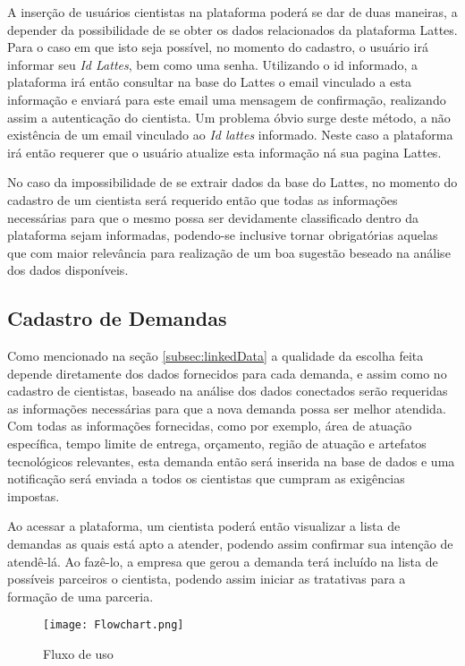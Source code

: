 A inserção de usuários cientistas na plataforma poderá se dar de duas maneiras, a depender da possibilidade de se obter os dados relacionados da plataforma Lattes. Para o caso em que isto seja possível, no momento do cadastro, o usuário irá informar seu \textit{Id Lattes}, bem como uma senha. Utilizando o id informado, a plataforma irá então consultar na base do Lattes o email vinculado a esta informação e enviará para este email uma mensagem de confirmação, realizando assim a autenticação do cientista. Um problema óbvio surge deste método, a não existência de um email vinculado ao \textit{Id lattes} informado. Neste caso a plataforma irá então requerer que o usuário atualize esta informação ná sua pagina Lattes.

No caso da impossibilidade de se extrair dados da base do Lattes, no momento do cadastro de um cientista será requerido então que todas as informações necessárias para que o mesmo possa ser devidamente classificado dentro da plataforma sejam informadas, podendo-se inclusive tornar obrigatórias aquelas que com maior relevância para realização de um boa sugestão beseado na análise dos dados disponíveis.  

\subsection{Cadastro de Demandas}\label{subsec:demandas}

Como mencionado na seção \ref{subsec:linkedData} a qualidade da escolha feita depende diretamente dos dados fornecidos para cada demanda, e assim como no cadastro de cientistas, baseado na análise dos dados conectados serão requeridas as informações necessárias para que a nova demanda possa ser melhor atendida. Com todas as informações fornecidas, como por exemplo, área de atuação específica, tempo limite de entrega, orçamento, região de atuação e artefatos tecnológicos relevantes, esta demanda então será inserida na base de dados e uma notificação será enviada a todos os cientistas que cumpram as exigências impostas. 

Ao acessar a plataforma, um cientista poderá então visualizar a lista de demandas as quais está apto a atender, podendo assim confirmar sua intenção de atendê-lá. Ao fazê-lo, a empresa que gerou a demanda terá incluído na lista de possíveis parceiros o cientista, podendo assim iniciar as tratativas para a formação de uma parceria.

\begin{figure}[htb]
    \caption{Fluxo de uso}
    \texttt{[image: Flowchart.png]}
    \label{fig:fluxograma}
\end{figure}

